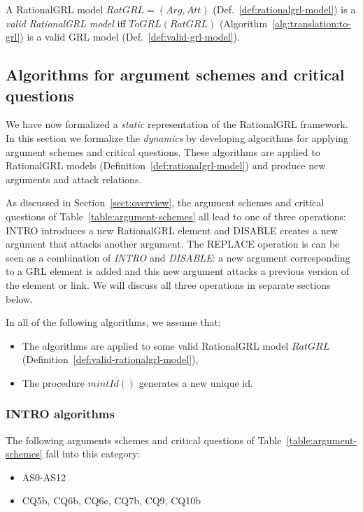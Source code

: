 \begin{definition}
\label{def:valid-rationalgrl-model}
A RationalGRL model $RatGRL = (Arg, Att)$ (Def.~\ref{def:rationalgrl-model})
is a \emph{valid RationalGRL model} iff $ToGRL(RatGRL)$ (Algorithm~\ref{alg:translation:to-grl}) is a valid GRL model (Def.~\ref{def:valid-grl-model}).
\end{definition}


\subsection{Algorithms for argument schemes and critical questions}
\label{sect:algorithms}

We have now formalized a \emph{static} representation of the RationalGRL framework. In this section we formalize the \emph{dynamics} by developing algorithms for applying argument schemes and critical questions. These algorithms are applied to RationalGRL models (Definition~\ref{def:rationalgrl-model}) and produce new arguments and attack relations. 

As discussed in Section~\ref{sect:overview}, the argument schemes and critical questions of Table~\ref{table:argument-schemes} all lead to one of three operations: \textsf{INTRO}
introduces a new RationalGRL element and \textsf{DISABLE} creates a new argument that attacks another argument. The \textsf{REPLACE} operation is can be seen as a combination of \emph{INTRO} and \emph{DISABLE}: a new argument corresponding to a GRL element is added and this new argument attacks a previous version of the element or link. We will discuss all three operations in separate sections below.

In all of the following algorithms, we assume that:
\begin{itemize}
\item The algorithms are applied to some valid RationalGRL model $RatGRL$ (Definition~\ref{def:valid-rationalgrl-model}),
\item The procedure $mintId()$ generates a new unique id.
\end{itemize}

\subsubsection{INTRO algorithms}
\label{sect:formalframework:intro}

The following arguments schemes and critical questions of Table~\ref{table:argument-schemes} fall into this category:
\begin{itemize}
\item AS0-AS12
\item CQ5b, CQ6b, CQ6c, CQ7b, CQ9, CQ10b
\end{itemize}

